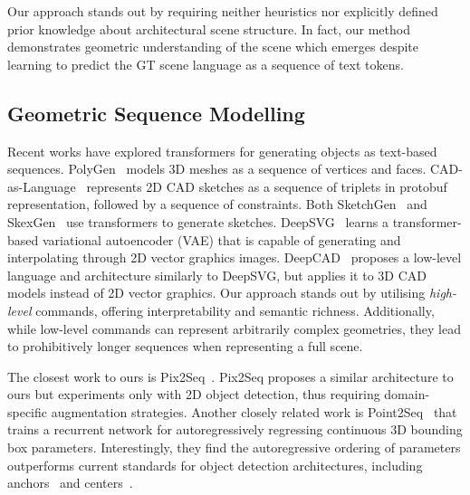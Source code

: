 Our approach stands out by requiring neither heuristics nor explicitly defined prior knowledge about architectural scene structure.
In fact, our method demonstrates geometric understanding of the scene which emerges despite learning to predict the GT scene language as a sequence of text tokens.

\subsection{Geometric Sequence Modelling}

Recent works have explored transformers for generating objects as text-based sequences.
PolyGen~\cite{nash2020polygen} models 3D meshes as a sequence of vertices and faces. 
CAD-as-Language~\cite{ganin2021computer} represents 2D CAD sketches as a sequence of triplets in protobuf representation, followed by a sequence of constraints. 
Both SketchGen~\cite{para2021sketchgen} and SkexGen~\cite{xu2022skexgen} use transformers to generate sketches.
DeepSVG~\cite{carlier2020deepsvg} learns a transformer-based variational autoencoder (VAE) that is capable of generating and interpolating through 2D vector graphics images. 
DeepCAD~\cite{wu2021deepcad} proposes a low-level language and architecture  similarly to DeepSVG, but applies it to 3D CAD models instead of 2D vector graphics.
Our approach stands out by utilising \textit{high-level} commands, offering interpretability and semantic richness. Additionally, while low-level commands can represent arbitrarily complex geometries, they lead to prohibitively longer sequences when representing a full scene.



The closest work to ours is Pix2Seq~\cite{chen2021pix2seq}. Pix2Seq proposes a similar architecture to ours but experiments only with 2D object detection, thus requiring domain-specific augmentation strategies. Another closely related work is Point2Seq~\cite{xue2022point2seq} that trains a recurrent network for autoregressively regressing continuous 3D bounding box parameters. Interestingly, they find the autoregressive ordering of parameters outperforms current standards for object detection architectures, including anchors~\cite{girshick2015fast} and centers~\cite{yin2021center}.





